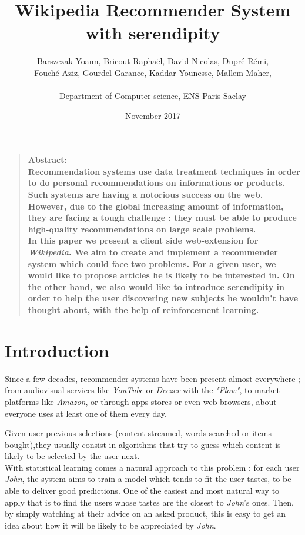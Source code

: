 \documentclass[11pt]{article}
\title{Wikipedia Recommender System with serendipity}
\author
    {
      Barszezak Yoann, Bricout Rapha\"el, David Nicolas, Dupr\'e R\'emi,\\
      Fouch\'e Aziz, Gourdel Garance, Kaddar Younesse, Mallem Maher,\\
      \\
      \normalsize{Department of Computer science, ENS Paris-Saclay}\\
    }
\date{November 2017}
\theoremstyle{plain}
\theoremstyle{definition}
\theoremstyle{remark}
\newenvironment{sciabstract}{
\begin{quote} \bf}
{\end{quote}}
\begin{document}
 


\baselineskip10pt


\maketitle 




\begin{sciabstract}
Abstract:\\

Recommendation systems use data treatment techniques in order to do personal recommendations on informations or products. Such systems are having a notorious success on the web. However, due to the global increasing amount of information, they are facing a tough challenge : they must be able to produce high-quality recommendations on large scale problems. \\
In this paper we present a client side web-extension for \textit{Wikipedia}. We aim to create and implement a recommender system which could face two problems. For a given user, we would like to propose articles he is likely to be interested in. On the other hand, we also would like to introduce serendipity in order to help the user discovering new subjects he wouldn't have thought about, with the help of reinforcement learning.
\end{sciabstract}


\tableofcontents


\section*{Introduction}

Since a few decades, recommender systems have been present almost everywhere ; from audiovisual services like \textit{YouTube} or \textit{Deezer} with the \textit{"Flow"}, to market platforms like \textit{Amazon}, or through apps stores or even web browsers, about everyone uses at least one of them every day. 

Given user previous selections (content streamed, words searched or items bought),they usually consist in algorithms that try to guess which content is likely to be selected by the user next. \\

With statistical learning comes a natural approach to this problem : for each user \textit{John}, the system aims to train a model which tends to fit the user tastes, to be able to deliver good predictions. One of the easiest and most natural way to apply that is to find the users whose tastes are the closest to \textit{John}'s ones. Then, by simply watching at their advice on an asked product, this is easy to get an idea about how it will be likely to be appreciated by \textit{John}.
\end{document}
